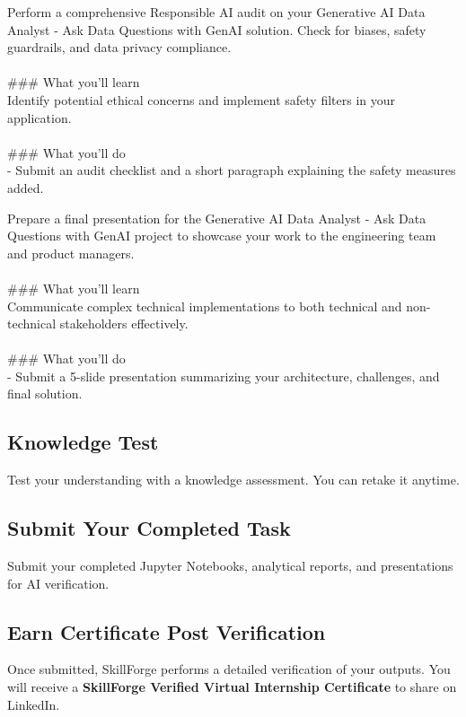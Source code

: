 \documentclass{article}
\begin{document}
Perform a comprehensive Responsible AI audit on your Generative AI Data Analyst - Ask Data Questions with GenAI solution. Check for biases, safety guardrails, and data privacy compliance. \\
 \\
### What you'll learn \\
Identify potential ethical concerns and implement safety filters in your application. \\
 \\
### What you'll do \\
- Submit an audit checklist and a short paragraph explaining the safety measures added.

Prepare a final presentation for the Generative AI Data Analyst - Ask Data Questions with GenAI project to showcase your work to the engineering team and product managers. \\
 \\
### What you'll learn \\
Communicate complex technical implementations to both technical and non-technical stakeholders effectively. \\
 \\
### What you'll do \\
- Submit a 5-slide presentation summarizing your architecture, challenges, and final solution.

\subsection*{Knowledge Test}
Test your understanding with a knowledge assessment. You can retake it anytime.\\

\subsection*{Submit Your Completed Task}
Submit your completed Jupyter Notebooks, analytical reports, and presentations for AI verification.\\

\subsection*{Earn Certificate Post Verification}
Once submitted, SkillForge performs a detailed verification of your outputs. You will receive a \textbf{SkillForge Verified Virtual Internship Certificate} to share on LinkedIn.\\
\end{document}
